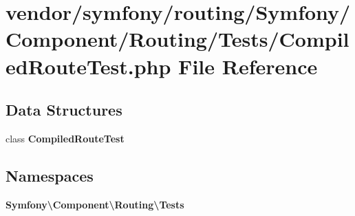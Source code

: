 \section{vendor/symfony/routing/\+Symfony/\+Component/\+Routing/\+Tests/\+Compiled\+Route\+Test.php File Reference}
\label{_compiled_route_test_8php}
\subsection*{Data Structures}
\begin{DoxyCompactItemize}
\item 
class {\bf Compiled\+Route\+Test}
\end{DoxyCompactItemize}
\subsection*{Namespaces}
\begin{DoxyCompactItemize}
\item 
 {\bf Symfony\textbackslash{}\+Component\textbackslash{}\+Routing\textbackslash{}\+Tests}
\end{DoxyCompactItemize}
